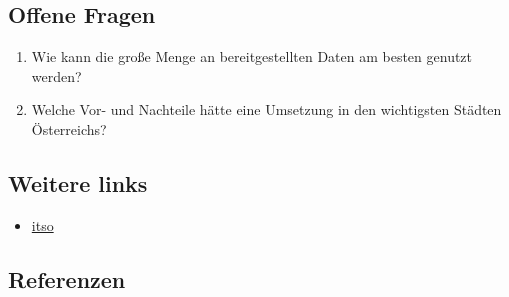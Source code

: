 \documentclass[
]{book}
\providecommand{\tightlist}{%
  \setlength{\itemsep}{0pt}\setlength{\parskip}{0pt}}
\begin{document}
\hypertarget{offene-fragen-24}{%
\subsection*{Offene Fragen}\label{offene-fragen-24}}

\begin{enumerate}
\def\labelenumi{\arabic{enumi}.}
\tightlist
\item
  Wie kann die große Menge an bereitgestellten Daten am besten genutzt werden?
\item
  Welche Vor- und Nachteile hätte eine Umsetzung in den wichtigsten Städten Österreichs?
\end{enumerate}

\hypertarget{weitere-links-22}{%
\subsection*{Weitere links}\label{weitere-links-22}}

\begin{itemize}
\tightlist
\item
  \href{https://www.itso.org.uk/}{itso}
\end{itemize}

\hypertarget{referenzen-26}{%
\subsection*{Referenzen}\label{referenzen-26}}
\end{document}
